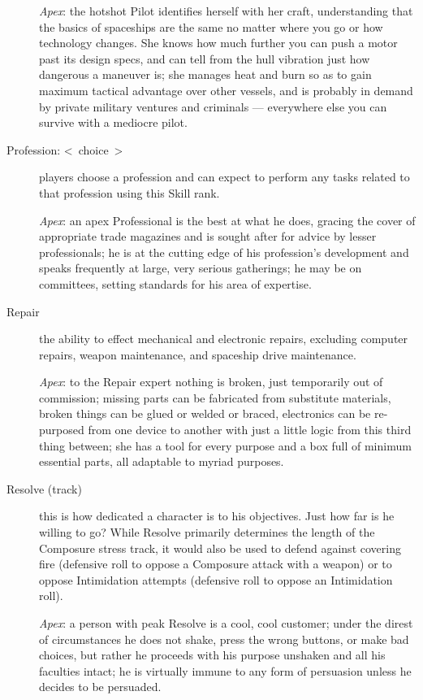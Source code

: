 \begin{description}
\emph{Apex}: the hotshot Pilot identifies herself with her craft, understanding that the basics of spaceships are the same no matter where you go or how technology changes. She knows how much further you can push a motor past its design specs, and can tell from the hull vibration just how dangerous a maneuver is; she manages heat and burn so as to gain maximum tactical advantage over other vessels, and is probably in demand by private military ventures and criminals --- everywhere else you can survive with a mediocre pilot.

\item[Profession: \textless~choice~\textgreater]
players choose a profession and can expect to perform any tasks related to that profession using this Skill rank.

\emph{Apex}: an apex Professional is the best at what he does, gracing the cover of appropriate trade magazines and is sought after for advice by lesser professionals; he is at the cutting edge of his profession's development and speaks frequently at large, very serious gatherings; he may be on committees, setting standards for his area of expertise.

\item[Repair]
the ability to effect mechanical and electronic repairs, excluding computer repairs, weapon maintenance, and spaceship drive maintenance.

\emph{Apex}: to the Repair expert nothing is broken, just temporarily out of commission; missing parts can be fabricated from substitute materials, broken things can be glued or welded or braced, electronics can be re-purposed from one device to another with just a little logic from this third thing between; she has a tool for every purpose and a box full of minimum essential parts, all adaptable to myriad purposes.

\item[Resolve (track)]
this is how dedicated a character is to his objectives. Just how far is he willing to go? While Resolve primarily determines the length of the Composure stress track, it would also be used to defend against covering fire (defensive roll to oppose a Composure attack with a weapon) or to oppose Intimidation attempts (defensive roll to oppose an Intimidation roll).

\emph{Apex}: a person with peak Resolve is a cool, cool customer; under the direst of circumstances he does not shake, press the wrong buttons, or make bad choices, but rather he proceeds with his purpose unshaken and all his faculties intact; he is virtually immune to any form of persuasion unless he decides to be persuaded.


\end{description}
